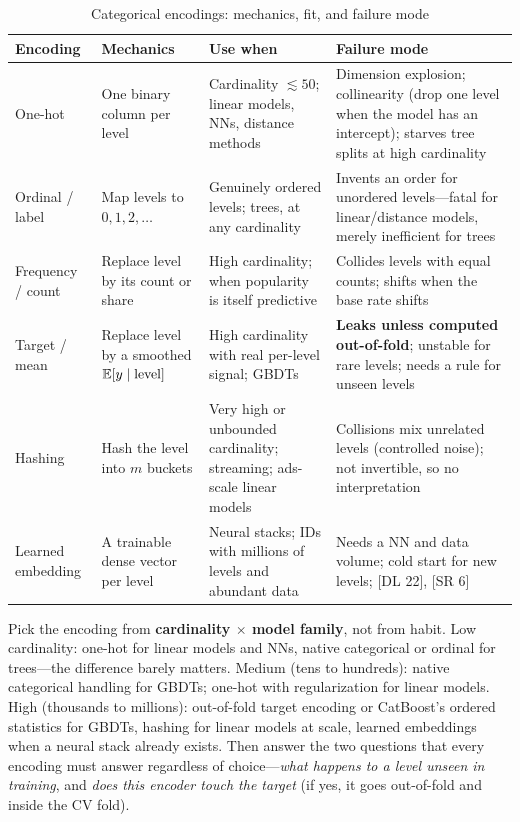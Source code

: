\begin{table}[H]
\centering
\small
\caption{Categorical encodings: mechanics, fit, and failure mode}
\label{cml:tab:encodings}
\begin{tabularx}{\textwidth}{lXXX}
\toprule
\textbf{Encoding} & \textbf{Mechanics} & \textbf{Use when} & \textbf{Failure mode} \\
\midrule
One-hot & One binary column per level & Cardinality $\lesssim 50$; linear models, NNs, distance methods & Dimension explosion; collinearity (drop one level when the model has an intercept); starves tree splits at high cardinality \\
Ordinal / label & Map levels to $0,1,2,\dots$ & Genuinely ordered levels; trees, at any cardinality & Invents an order for unordered levels---fatal for linear/distance models, merely inefficient for trees \\
Frequency / count & Replace level by its count or share & High cardinality; when popularity is itself predictive & Collides levels with equal counts; shifts when the base rate shifts \\
Target / mean & Replace level by a smoothed $\operatorname{\mathbb{E}}[y \mid \text{level}]$ & High cardinality with real per-level signal; GBDTs & \textbf{Leaks unless computed out-of-fold}; unstable for rare levels; needs a rule for unseen levels \\
Hashing & Hash the level into $m$ buckets & Very high or unbounded cardinality; streaming; ads-scale linear models & Collisions mix unrelated levels (controlled noise); not invertible, so no interpretation \\
Learned embedding & A trainable dense vector per level & Neural stacks; IDs with millions of levels and abundant data & Needs a NN and data volume; cold start for new levels; [DL 22], [SR 6] \\
\bottomrule
\end{tabularx}
\end{table}

\begin{keyinsight}
Pick the encoding from \textbf{cardinality $\times$ model family}, not from habit. Low cardinality: one-hot for linear models and NNs, native categorical or ordinal for trees---the difference barely matters. Medium (tens to hundreds): native categorical handling for GBDTs; one-hot with regularization for linear models. High (thousands to millions): out-of-fold target encoding or CatBoost's ordered statistics for GBDTs, hashing for linear models at scale, learned embeddings when a neural stack already exists. Then answer the two questions that every encoding must answer regardless of choice---\emph{what happens to a level unseen in training}, and \emph{does this encoder touch the target} (if yes, it goes out-of-fold and inside the CV fold).
\end{keyinsight}

